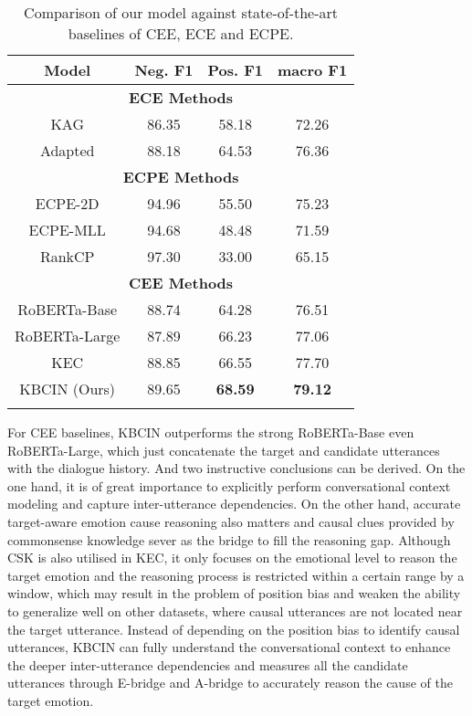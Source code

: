 \documentclass[letterpaper]{article} \usepackage{aaai23}  \usepackage{times}  \usepackage{helvet}  \usepackage{courier}  \usepackage[hyphens]{url}  \usepackage{graphicx} \urlstyle{rm} \def\UrlFont{\rm}  \usepackage{natbib}  \usepackage{caption} \frenchspacing  \setlength{\pdfpagewidth}{8.5in} \setlength{\pdfpageheight}{11in} \usepackage{algorithm}
\begin{document}
\begin{table}
\footnotesize
\centering
\begin{tabular}{cccc}
\toprule
\textbf{Model} & Neg. F1 & Pos. F1 & macro F1\\
\midrule
\multicolumn{4}{c}{\textbf{ECE Methods}}  \\
KAG &86.35 &58.18 &72.26\\
Adapted  &88.18 &64.53 &76.36\\
\midrule
\multicolumn{4}{c}{\textbf{ECPE Methods}}  \\
ECPE-2D &94.96 &55.50 &75.23\\ 
ECPE-MLL &94.68 &48.48 &71.59\\
RankCP &97.30 &33.00 &65.15\\
\midrule
\multicolumn{4}{c}{\textbf{CEE Methods}}  \\
RoBERTa-Base &88.74 &64.28 &76.51\\ 
RoBERTa-Large &87.89 &66.23 &77.06\\ 
KEC &88.85 &66.55 &77.70\\ 
\midrule
KBCIN (Ours) &89.65 &\textbf{68.59} &\textbf{79.12}\\
\bottomrule& 
\end{tabular}
\caption{Comparison of our model against state-of-the-art baselines of CEE, ECE and ECPE.}
\label{tab2}
\end{table}

For CEE baselines, KBCIN outperforms the strong RoBERTa-Base even RoBERTa-Large, which just concatenate the target and candidate utterances with the dialogue history. And two instructive conclusions can be derived. On the one hand, it is of great importance to explicitly perform conversational context modeling and capture inter-utterance dependencies. On the other hand, accurate target-aware emotion cause reasoning also matters and causal clues provided by commonsense knowledge sever as the bridge to fill the reasoning gap. Although CSK is also utilised in KEC, it only focuses on the emotional level to reason the target emotion and the reasoning process is restricted within a certain range by a window, which may result in the problem of position bias and weaken the ability to generalize well on other datasets, where causal utterances are not located near the target utterance. Instead of depending on the position bias to identify causal utterances, KBCIN can fully understand the conversational context to enhance the deeper inter-utterance dependencies and measures all the candidate utterances through E-bridge and A-bridge to accurately reason the cause of the target emotion.
\end{document}
